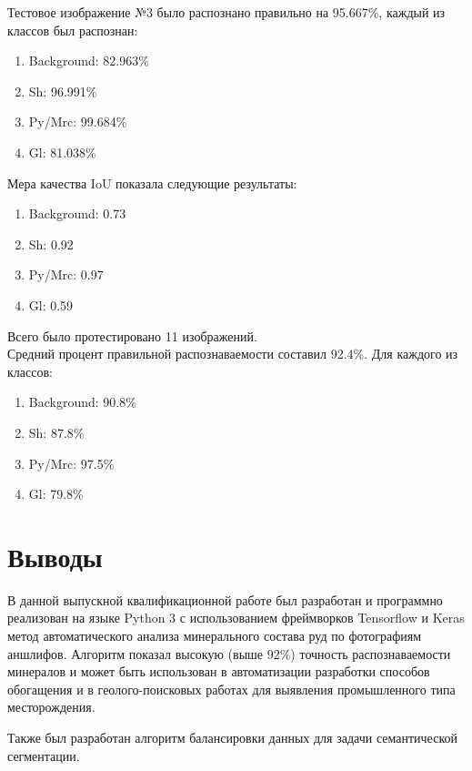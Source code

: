 Тестовое изображение №3 было распознано правильно на 95.667\%, каждый из классов был распознан: \\
\begin{enumerate}[nosep]
    \item Background: 82.963\%
    \item Sh: 96.991\%
    \item Py/Mrc: 99.684\%
    \item Gl: 81.038\%
\end{enumerate}{}
Мера качества IoU показала следующие результаты:
\begin{enumerate}[nosep]
    \item Background: 0.73
    \item Sh: 0.92
    \item Py/Mrc: 0.97
    \item Gl: 0.59
\end{enumerate}{}

\newpage
Всего было протестировано 11 изображений. \\Средний процент правильной распознаваемости составил 92.4\%. Для каждого из классов:
\begin{enumerate}
    \item Background: 90.8\%
    \item Sh: 87.8\%
    \item Py/Mrc: 97.5\%
    \item Gl: 79.8\%
\end{enumerate}

\newpage
\section{Выводы}
В данной выпускной квалификационной работе был разработан и программно реализован на языке Python 3 с использованием фреймворков Tensorflow \cite{Tensorflow} и Keras \cite{Keras} метод автоматического анализа минерального состава руд по фотографиям аншлифов. Алгоритм показал высокую (выше 92\%) точность распознаваемости минералов и может быть использован в автоматизации разработки способов обогащения и в геолого-поисковых работах для выявления промышленного типа месторождения.
\par Также был разработан алгоритм балансировки данных для задачи семантической сегментации.


\newpage


